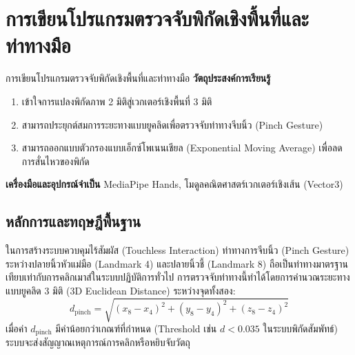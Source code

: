 
\chapter{การเขียนโปรแกรมตรวจจับพิกัดเชิงพื้นที่และท่าทางมือ}
\label{ch:lab03}


\vspace{0.4cm}

\begin{labobjectivebox}{การเขียนโปรแกรมตรวจจับพิกัดเชิงพื้นที่และท่าทางมือ}
\textbf{วัตถุประสงค์การเรียนรู้}
\begin{enumerate}[leftmargin=1.8cm, itemsep=2pt]
    \item เข้าใจการแปลงพิกัดภาพ 2 มิติสู่เวกเตอร์เชิงพื้นที่ 3 มิติ
    \item สามารถประยุกต์สมการระยะทางแบบยูคลิดเพื่อตรวจจับท่าทางจีบนิ้ว (Pinch Gesture)
    \item สามารถออกแบบตัวกรองแบบเอ็กซ์โพเนนเชียล (Exponential Moving Average) เพื่อลดการสั่นไหวของพิกัด
\end{enumerate}

\vspace{4pt}
\textbf{เครื่องมือและอุปกรณ์จำเป็น} \enspace MediaPipe Hands, โมดูลคณิตศาสตร์เวกเตอร์เชิงเส้น (Vector3)
\end{labobjectivebox}

\section{หลักการและทฤษฎีพื้นฐาน}

ในการสร้างระบบควบคุมไร้สัมผัส (Touchless Interaction) ท่าทางการจีบนิ้ว (Pinch Gesture) ระหว่างปลายนิ้วหัวแม่มือ (Landmark 4) และปลายนิ้วชี้ (Landmark 8) ถือเป็นท่าทางมาตรฐานเทียบเท่ากับการคลิกเมาส์ในระบบปฏิบัติการทั่วไป การตรวจจับท่าทางนี้ทำได้โดยการคำนวณระยะทางแบบยูคลิด 3 มิติ (3D Euclidean Distance) ระหว่างจุดทั้งสอง:
\begin{equation}
d_{\text{pinch}} = \sqrt{(x_8 - x_4)^2 + (y_8 - y_4)^2 + (z_8 - z_4)^2}
\end{equation}
เมื่อค่า $d_{\text{pinch}}$ มีค่าน้อยกว่าเกณฑ์ที่กำหนด (Threshold เช่น $d < 0.035$ ในระบบพิกัดสัมพัทธ์) ระบบจะส่งสัญญาณเหตุการณ์การคลิกหรือหยิบจับวัตถุ

